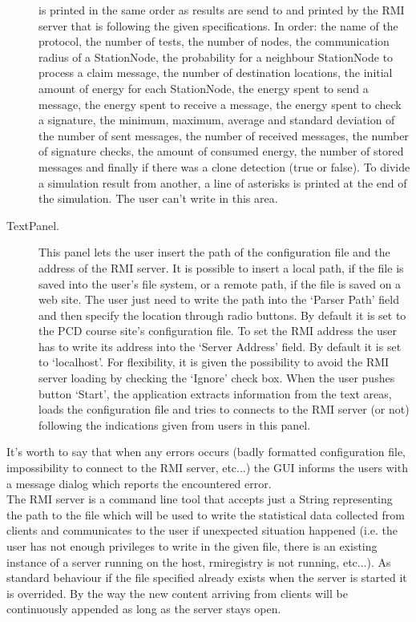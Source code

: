 \begin{description}
  is printed in the same order as results are send to and printed by the RMI server
  that is following the given specifications. In order: the name of the protocol,
  the number of tests, the number of nodes, the communication radius of a StationNode,
  the probability for a neighbour StationNode to  process a claim message, the number
  of destination locations, the initial amount of energy for each StationNode, the
  energy spent to send a message, the energy spent to receive a message, the energy
  spent to check a signature, the minimum, maximum, average and standard
  deviation of the number of sent messages,  the number of received messages, 
  the number of signature checks, the amount of consumed energy, the number of 
  stored messages and finally if there was a clone detection (true or false).
  To divide a simulation result from another, a line of asterisks is printed at the
  end of the simulation. The user can't write in this area.
  \item[TextPanel.] This panel lets the user insert the path of the configuration
  file and the address of the RMI server. It is possible to insert a local path, if
  the file is saved into the user's file system, or a remote path, if the file is
  saved on a web site. The user just need to write the path into the `Parser Path'
  field and then specify the location through radio buttons. By default it is set
  to the PCD course site's configuration file.
  To set the RMI address the user has to write its address into the `Server Address'
  field. By default it is set to `localhost'. For flexibility, it is given the
  possibility to avoid the RMI server loading by checking the `Ignore' check box.
  When the user pushes button `Start', the application extracts information from
  the text areas, loads the configuration file and tries to connects to the 
  RMI server (or not) following the indications given from users in this panel.
\end{description}

It's worth to say that when any errors occurs (badly formatted configuration
file, impossibility to connect to the RMI server, etc...) the GUI informs the
users with a message dialog which reports the encountered error.
\\[1cm]
The RMI server is a command line tool that accepts just a String representing 
the path to the file which will be used to write the statistical data collected
from clients and communicates to the user if unexpected situation happened 
(i.e. the user has not enough privileges to write in the given file, there is 
an existing instance of a server running on the host, rmiregistry is not 
running, etc...). As standard behaviour if the file
specified already exists when the server is started it is overrided. By the
way the new content arriving from clients will be continuously appended as 
long as the server stays open.
